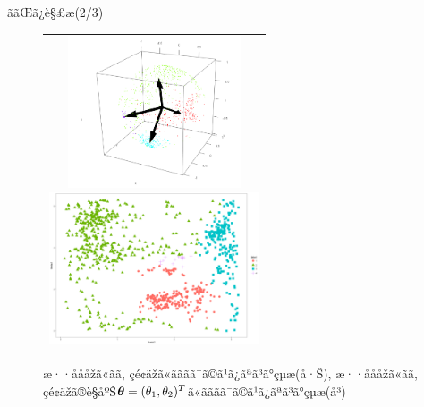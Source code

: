 \documentclass[dvipdfmx]{beamer} %
\newcommand{\bm}[1]{\mbox{\boldmath $#1$}}
\begin{document}
\begin{frame}{ããŒã¿è§£æ(2/3)}

\vspace{-1zh}
\begin{figure}[H]
\begin{tabular}{c}

\begin{minipage}{0.5\hsize}
\begin{center}
\includegraphics[clip,height= 45mm]{data/cluster_3d.png}
\end{center}
\end{minipage}
\hspace{-0.5cm}
\begin{minipage}{0.5\hsize}
\begin{center}
\includegraphics[clip,height= 45mm]{data/cluster_4.png}
\end{center}
\end{minipage}

\end{tabular}
\label{fig2}
\caption{æ··åååžã«ãã, çé¢äžã«ãããã¯ã©ã¹ã¿ãªã³ã°çµæ(å·Š), æ··åååžã«ãã, çé¢äžã®è§åºŠ$\bm \theta = (\theta_1, \theta_2)^T$ã«ãããã¯ã©ã¹ã¿ãªã³ã°çµæ(å³)}
\end{figure}
\end{frame}
\end{document}
